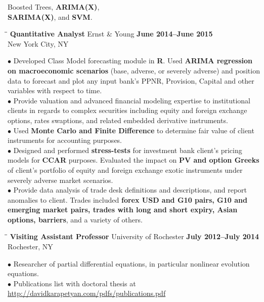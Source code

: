 \documentclass{resume}
\begin{document}
\begin{resume}
{Boosted Trees}, \textbf{ARIMA(X)}, \\ \textbf{SARIMA(X)}, and \textbf{SVM}. 
\begin{tabbing}
\hspace{2.3in}\= \hspace{2.6in}\= \kill
{\bf Quantitative Analyst} \> Ernst \& Young   
\>\textbf{June 2014--June 2015 } \\
    \>New York City, NY 
\end{tabbing}
$\bullet$
Developed Class Model forecasting module in \textbf{R}. Used
\textbf{ARIMA regression \\ on macroeconomic scenarios} (base, adverse, or severely adverse) and position data to forecast and plot any input bank’s PPNR,
Provision, Capital and other variables with respect to time.  \\
$\bullet$ Provide valuation and advanced financial modeling expertise to
institutional clients in regards to complex securities including equity and
foreign exchange options, rates swaptions, and related embedded derivative
instruments.  \\
$\bullet$ 
Used \textbf{Monte Carlo and Finite Difference} to determine fair value of
client instruments for accounting purposes.  \\
$\bullet$ Designed and performed \textbf{stress-tests} for investment bank
client’s pricing models for \textbf{CCAR} purposes. Evaluated the impact on
\textbf{PV and option Greeks} of client’s portfolio of equity and foreign exchange exotic instruments under severely adverse market scenarios. 
\\
$\bullet$
Provide data analysis of trade desk definitions and descriptions, and report
anomalies to client. Trades included \textbf{forex USD and G10 pairs, G10 and
	emerging market pairs, trades with long and short expiry, Asian options,
barriers}, and a variety of others.
\begin{tabbing}
\hspace{2.3in}\= \hspace{2.6in}\= \kill
{\bf Visiting Assistant Professor} \>University of Rochester     
\>\textbf{July 2012--July 2014} \\
    \>Rochester, NY 
\end{tabbing}
$\bullet$ Researcher of partial differential equations, in particular nonlinear evolution equations.  
\\
$\bullet$ Publications list with doctoral thesis at \url{http://davidkarapetyan.com/pdfs/publications.pdf}
\\

\end{resume}
\end{document}
